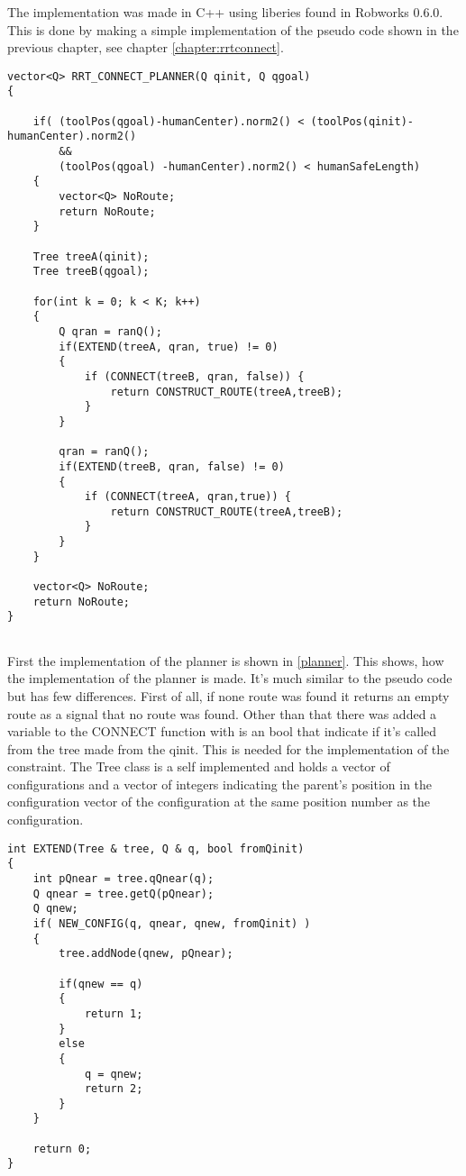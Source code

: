The implementation was made in C++ using liberies found in Robworks 0.6.0. This is done by making a simple implementation of the pseudo code shown in the previous chapter, see chapter \ref{chapter:rrtconnect}. 

\begin{lstlisting}[caption=The implementation of the planner, label=planner]
vector<Q> RRT_CONNECT_PLANNER(Q qinit, Q qgoal)
{
    
    if( (toolPos(qgoal)-humanCenter).norm2() < (toolPos(qinit)-humanCenter).norm2()
        &&
        (toolPos(qgoal) -humanCenter).norm2() < humanSafeLength)
    {
        vector<Q> NoRoute;
        return NoRoute;
    }
    
    Tree treeA(qinit);
    Tree treeB(qgoal);
    
    for(int k = 0; k < K; k++)
    {
        Q qran = ranQ();
        if(EXTEND(treeA, qran, true) != 0)
        {
            if (CONNECT(treeB, qran, false)) {
                return CONSTRUCT_ROUTE(treeA,treeB);
            }
        }
        
        qran = ranQ();
        if(EXTEND(treeB, qran, false) != 0)
        {
            if (CONNECT(treeA, qran,true)) {
                return CONSTRUCT_ROUTE(treeA,treeB);
            }
        }
    }
    
    vector<Q> NoRoute;
    return NoRoute;
}
	
\end{lstlisting}
First the implementation of the planner is shown in \ref{planner}. This shows, how the implementation of the planner is made. It's much similar to the pseudo code but has few differences.
First of all, if none route was found it returns an empty route as a signal that no route was found. Other than that there was added a variable to the CONNECT function with is an bool that indicate if it's called from the tree made from the qinit. This is needed for the implementation of the constraint. The Tree class is a self implemented and holds a vector of configurations and a vector of integers indicating the parent's position in the configuration vector of the configuration at the same position number as the configuration.  

\begin{lstlisting}[caption=The implementation of the planner, label=EXTEND]
int EXTEND(Tree & tree, Q & q, bool fromQinit)
{
    int pQnear = tree.qQnear(q);
    Q qnear = tree.getQ(pQnear);
    Q qnew;
    if( NEW_CONFIG(q, qnear, qnew, fromQinit) )
    {
        tree.addNode(qnew, pQnear);
        
        if(qnew == q)
        {
            return 1;
        }
        else
        {
            q = qnew;
            return 2;
        }
    }
    
    return 0;
}
\end{lstlisting}

